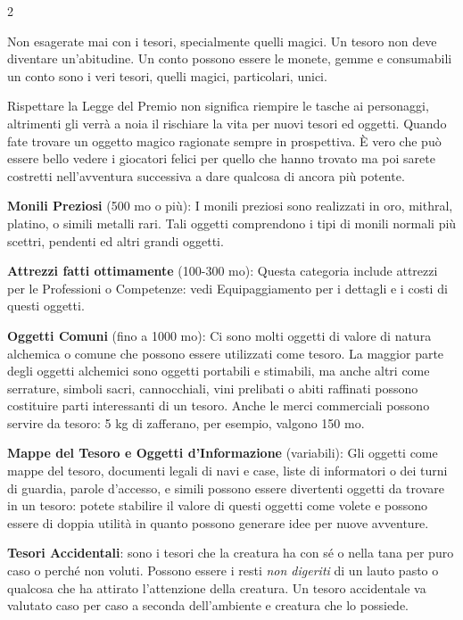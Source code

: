 \begin{multicols}{2}
\begin{narratore}
Non esagerate mai con i tesori, specialmente quelli magici. Un tesoro non deve diventare un'abitudine. Un conto possono essere le monete, gemme e consumabili un conto sono i veri tesori, quelli magici, particolari, unici.

Rispettare la Legge del Premio non significa riempire le tasche ai personaggi, altrimenti gli verrà a noia il rischiare la vita per nuovi tesori ed oggetti. Quando fate trovare un oggetto magico ragionate sempre in prospettiva. È vero che può essere bello vedere i giocatori felici per quello che hanno trovato ma poi sarete costretti nell'avventura successiva a dare qualcosa di ancora più potente.
\end{narratore}

\textbf{Monili Preziosi} (500 mo o più): I monili preziosi sono realizzati in oro, mithral, platino, o simili metalli rari. Tali oggetti comprendono i tipi di monili normali più scettri, pendenti ed altri grandi oggetti.

\textbf{Attrezzi fatti ottimamente} (100-300 mo): Questa categoria include attrezzi per le Professioni o Competenze: vedi Equipaggiamento per i dettagli e i costi di questi oggetti.

\textbf{Oggetti Comuni} (fino a 1000 mo): Ci sono molti oggetti di valore di natura alchemica o comune che possono essere utilizzati come tesoro. La maggior parte degli oggetti alchemici sono oggetti portabili e stimabili, ma anche altri come serrature, simboli sacri, cannocchiali, vini prelibati o abiti raffinati possono costituire parti interessanti di un tesoro. Anche le merci commerciali possono servire da tesoro: 5 kg di zafferano, per esempio, valgono 150 mo.

\textbf{Mappe del Tesoro e Oggetti d'Informazione} (variabili): Gli oggetti come mappe del tesoro, documenti legali di navi e case, liste di informatori o dei turni di guardia, parole d'accesso, e simili possono essere divertenti oggetti da trovare in un tesoro: potete stabilire il valore di questi oggetti come volete e possono essere di doppia utilità in quanto possono generare idee per nuove avventure.

\textbf{Tesori Accidentali}: sono i tesori che la creatura ha con sé o nella tana per puro caso o perché non voluti. Possono essere i resti \emph{non digeriti} di un lauto pasto o qualcosa che ha attirato l'attenzione della creatura. Un tesoro accidentale  va valutato caso per caso a seconda dell'ambiente e creatura che lo possiede.


\end{multicols}
